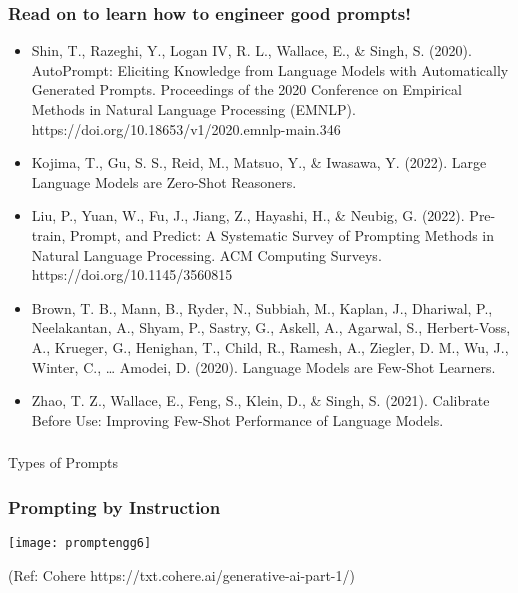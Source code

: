 
\begin{frame}[fragile]\frametitle{Read on to learn how to engineer good prompts!}

\begin{itemize}
\item Shin, T., Razeghi, Y., Logan IV, R. L., Wallace, E., \& Singh, S. (2020). AutoPrompt: Eliciting Knowledge from Language Models with Automatically Generated Prompts. Proceedings of the 2020 Conference on Empirical Methods in Natural Language Processing (EMNLP). https://doi.org/10.18653/v1/2020.emnlp-main.346 
\item Kojima, T., Gu, S. S., Reid, M., Matsuo, Y., \& Iwasawa, Y. (2022). Large Language Models are Zero-Shot Reasoners. 
\item Liu, P., Yuan, W., Fu, J., Jiang, Z., Hayashi, H., \& Neubig, G. (2022). Pre-train, Prompt, and Predict: A Systematic Survey of Prompting Methods in Natural Language Processing. ACM Computing Surveys. https://doi.org/10.1145/3560815 
\item Brown, T. B., Mann, B., Ryder, N., Subbiah, M., Kaplan, J., Dhariwal, P., Neelakantan, A., Shyam, P., Sastry, G., Askell, A., Agarwal, S., Herbert-Voss, A., Krueger, G., Henighan, T., Child, R., Ramesh, A., Ziegler, D. M., Wu, J., Winter, C., … Amodei, D. (2020). Language Models are Few-Shot Learners. 
\item Zhao, T. Z., Wallace, E., Feng, S., Klein, D., \& Singh, S. (2021). Calibrate Before Use: Improving Few-Shot Performance of Language Models.
\end{itemize}
\end{frame}


\begin{frame}[fragile]\frametitle{}
\begin{center}
{\Large Types of Prompts}
\end{center}
\end{frame}


\begin{frame}[fragile]\frametitle{Prompting by Instruction}

\begin{center}
\texttt{[image: promptengg6]}

{\tiny (Ref: Cohere https://txt.cohere.ai/generative-ai-part-1/)}

\end{center}		
		


\end{frame}

